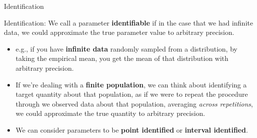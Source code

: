 \documentclass[xcolor={dvipsnames}, handout]{beamer}
\begin{document}

\begin{frame}{Identification}

\begin{wideitemize}
\item Identification: We call a parameter \textbf{identifiable} if in the case that we had infinite data, we could approximate the true parameter value to arbitrary precision. \pause
\begin{itemize}
\item e.g., if you have \textbf{infinite data} randomly sampled from a distribution, by taking the empirical mean, you get the mean of that distribution with arbitrary precision.\pause
\item If we're dealing with a \textbf{finite population}, we can think about identifying a target quantity about that population, as if we were to repeat the procedure through we observed data about that population, averaging \textit{across repetitions}, we could approximate the true quantity to arbitrary precision.\pause
\item We can consider parameters to be \textbf{point identified} or \textbf{interval identified}. 
\end{itemize}
\end{wideitemize}

\end{frame}


\end{document}
